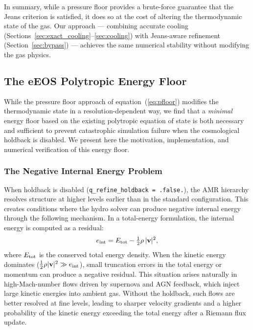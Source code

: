 \documentclass[fleqn,usenatbib]{mnras}
\newcommand{\code}[1]{\texttt{#1}}
\begin{document}
In summary, while a pressure floor provides a brute-force guarantee
that the Jeans criterion is satisfied, it does so at the cost of
altering the thermodynamic state of the gas.  Our approach ---
combining accurate cooling (Sections~\ref{sec:exact_cooling}--\ref{sec:cooling}) with
Jeans-aware refinement (Section~\ref{sec:bypass}) --- achieves the
same numerical stability without modifying the gas physics.


\subsection{The eEOS Polytropic Energy Floor}
\label{sec:eeos}

While the pressure floor approach of equation~(\ref{eq:pfloor})
modifies the thermodynamic state in a resolution-dependent way, we
find that a \emph{minimal} energy floor based on the existing
polytropic equation of state is both necessary and sufficient to
prevent catastrophic simulation failure when the cosmological holdback
is disabled.  We present here the motivation, implementation, and
numerical verification of this energy floor.

\subsubsection{The Negative Internal Energy Problem}
\label{sec:eint_negative}

When holdback is disabled (\code{q\_refine\_holdback\,=\,.false.}),
the AMR hierarchy resolves structure at higher levels earlier than in
the standard configuration.  This creates conditions where the hydro
solver can produce negative internal energy through the following
mechanism.  In a total-energy formulation, the internal energy is
computed as a residual:
\begin{equation}
  e_{\rm int} = E_{\rm tot} - \tfrac{1}{2}\rho\,|\mathbf{v}|^2,
  \label{eq:eint_residual}
\end{equation}
where $E_{\rm tot}$ is the conserved total energy density.  When the
kinetic energy dominates ($\frac{1}{2}\rho|\mathbf{v}|^2 \gg
e_{\rm int}$), small truncation errors in the total energy or momentum
can produce a negative residual.  This situation arises naturally in
high-Mach-number flows driven by supernova and AGN feedback, which
inject large kinetic energies into ambient gas.  Without the holdback,
such flows are better resolved at fine levels, leading to sharper
velocity gradients and a higher probability of the kinetic energy
exceeding the total energy after a Riemann flux update.
\end{document}
